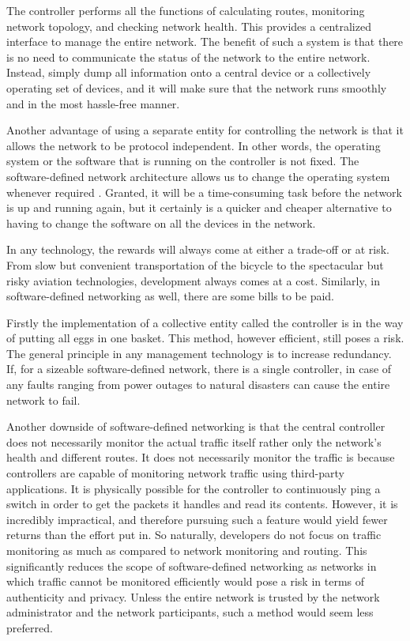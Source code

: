      The controller performs all the functions of calculating routes, monitoring network topology, and checking network health. This provides a centralized interface to manage the entire network. The benefit of such a system is that there is no need to communicate the status of the network to the entire network. Instead, simply dump all information onto a central device or a collectively operating set of devices, and it will make sure that the network runs smoothly and in the most hassle-free manner.
     
    Another advantage of using a separate entity for controlling the network is that it allows the network to be protocol independent. In other words, the operating system or the software that is running on the controller is not fixed. The software-defined network architecture allows us to change the operating system whenever required \cite{arpanet2004}. Granted, it will be a time-consuming task before the network is up and running again, but it certainly is a quicker and cheaper alternative to having to change the software on all the devices in the network.

    In any technology, the rewards will always come at either a trade-off or at risk. From slow but convenient transportation of the bicycle to the spectacular but risky aviation technologies, development always comes at a cost.
    Similarly, in software-defined networking as well, there are some bills to be paid.
    
    Firstly the implementation of a collective entity called the controller is in the way of putting all eggs in one basket. This method, however efficient, still poses a risk. The general principle in any management technology is to increase redundancy. If, for a sizeable software-defined network, there is a single controller, in case of any faults ranging from power outages to natural disasters can cause the entire network to fail.  
    
    Another downside of software-defined networking is that the central controller does not necessarily monitor the actual traffic itself rather only the network's health and different routes. It does not necessarily monitor the traffic is because controllers are capable of monitoring network traffic using third-party applications. It is physically possible for the controller to continuously ping a switch in order to get the packets it handles and read its contents. However, it is incredibly impractical, and therefore pursuing such a feature would yield fewer returns than the effort put in. So naturally, developers do not focus on traffic monitoring as much as compared to network monitoring and routing. This significantly reduces the scope of software-defined networking as networks in which traffic cannot be monitored efficiently would pose a risk in terms of authenticity and privacy. Unless the entire network is trusted by the network administrator and the network participants, such a method would seem less preferred.
    
